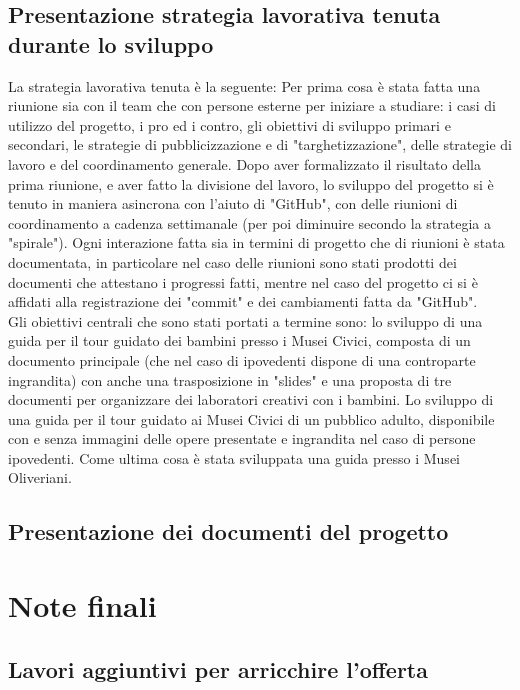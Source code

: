 \documentclass[hidelinks,12pt,a4paper]{article}
\begin{document}
\begin{flushleft}
			\subsection{Presentazione strategia lavorativa tenuta durante lo sviluppo}
			La strategia lavorativa tenuta è la seguente: Per prima cosa è stata fatta una riunione sia con il team che con persone esterne per iniziare a studiare: i casi di utilizzo del progetto, i pro ed i contro, gli obiettivi di sviluppo primari e secondari, le strategie di pubblicizzazione e di "targhetizzazione", delle strategie di lavoro e del coordinamento generale. Dopo aver formalizzato il risultato della prima riunione, e aver fatto la divisione del lavoro, lo sviluppo del progetto si è tenuto in maniera asincrona con l'aiuto di "GitHub", con delle riunioni di coordinamento a cadenza settimanale (per poi diminuire secondo la strategia a "spirale"). Ogni interazione fatta sia in termini di progetto che di riunioni è stata documentata, in particolare nel caso delle riunioni sono stati prodotti dei documenti che attestano i progressi fatti, mentre nel caso del progetto ci si è affidati alla registrazione dei "commit" e dei cambiamenti fatta da "GitHub".\\
			Gli obiettivi centrali che sono stati portati a termine sono: lo sviluppo di una guida per il tour guidato dei bambini presso i Musei Civici, composta di un documento principale (che nel caso di ipovedenti dispone di una controparte ingrandita) con anche una trasposizione in "slides" e una proposta di tre documenti per organizzare dei laboratori creativi con i bambini. Lo sviluppo di una guida per il tour guidato ai Musei Civici di un pubblico adulto, disponibile con e senza immagini delle opere presentate e ingrandita nel caso di persone ipovedenti. Come ultima cosa è stata sviluppata una guida presso i Musei Oliveriani.
			
			\subsection{Presentazione dei documenti del progetto}
		
		\section{Note finali}
			\subsection{Lavori aggiuntivi per arricchire l'offerta}
		
	\end{flushleft}
\end{document}
